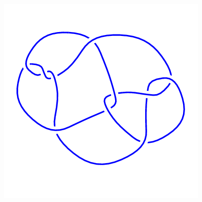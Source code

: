 \begin{figure}[H]
\begin{minipage}[b]{.18\linewidth}
	\end{minipage}
	\begin{minipage}[b]{.18\linewidth}
		\centering
		\includegraphics[width=\linewidth]{../data/10_51.png}
	\end{minipage}
\end{figure}
